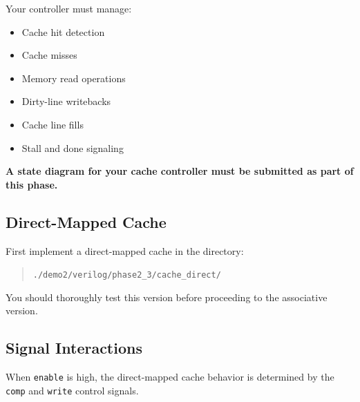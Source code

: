 \documentclass[12pt]{article}
\begin{document}
Your controller must manage:

\begin{itemize}
\item Cache hit detection
\item Cache misses
\item Memory read operations
\item Dirty-line writebacks
\item Cache line fills
\item Stall and done signaling
\end{itemize}

\textbf{A state diagram for your cache controller must be submitted as part of this phase.}

\subsection*{Direct-Mapped Cache}

First implement a direct-mapped cache in the directory:

\begin{quote}
\texttt{./demo2/verilog/phase2\_3/cache\_direct/}
\end{quote}

You should thoroughly test this version before proceeding to the associative version.

\subsection*{Signal Interactions}

When \texttt{enable} is high, the direct-mapped cache behavior is determined by
the \texttt{comp} and \texttt{write} control signals.
\end{document}
